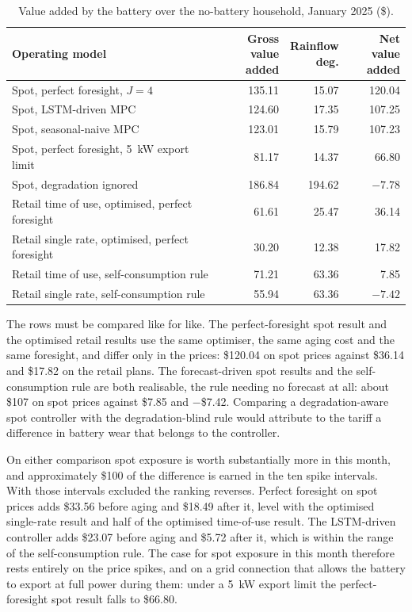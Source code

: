 \begin{table}[htbp]
    \centering
    \small
    \caption{Value added by the battery over the no-battery household, January 2025 (\$).}
    \label{tab:comparison}
    \begin{tabular}{@{}lrrr@{}}
        \toprule
        Operating model & \shortstack{Gross value\\added} & \shortstack{Rainflow\\deg.} &
        \shortstack{Net value\\added} \\
        \midrule
        Spot, perfect foresight, $J=4$               & 135.11 & 15.07  & 120.04 \\
        Spot, LSTM-driven MPC                        & 124.60 & 17.35  & 107.25 \\
        Spot, seasonal-naive MPC                     & 123.01 & 15.79  & 107.23 \\
        Spot, perfect foresight, 5~kW export limit   & 81.17  & 14.37  & 66.80 \\
        Spot, degradation ignored                    & 186.84 & 194.62 & $-7.78$ \\
        \midrule
        Retail time of use, optimised, perfect foresight & 61.61 & 25.47 & 36.14 \\
        Retail single rate, optimised, perfect foresight & 30.20 & 12.38 & 17.82 \\
        Retail time of use, self-consumption rule    & 71.21  & 63.36  & 7.85 \\
        Retail single rate, self-consumption rule    & 55.94  & 63.36  & $-7.42$ \\
        \bottomrule
    \end{tabular}
\end{table}

The rows must be compared like for like. The perfect-foresight spot result and the
optimised retail results use the same optimiser, the same aging cost and the same
foresight, and differ only in the prices: \$120.04 on spot prices against \$36.14 and
\$17.82 on the retail plans. The forecast-driven spot results and the self-consumption
rule are both realisable, the rule needing no forecast at all: about \$107 on spot
prices against \$7.85 and $-$\$7.42. Comparing a degradation-aware spot controller with
the degradation-blind rule would attribute to the tariff a difference in battery wear
that belongs to the controller.

On either comparison spot exposure is worth substantially more in this month, and
approximately \$100 of the difference is earned in the ten spike intervals. With those
intervals excluded the ranking reverses. Perfect foresight on spot prices adds \$33.56
before aging and \$18.49 after it, level with the optimised single-rate result and half
of the optimised time-of-use result. The LSTM-driven controller adds \$23.07 before
aging and \$5.72 after it, which is within the range of the self-consumption rule. The
case for spot exposure in this month therefore rests entirely on the price spikes, and
on a grid connection that allows the battery to export at full power during them: under
a 5~kW export limit the perfect-foresight spot result falls to \$66.80.

